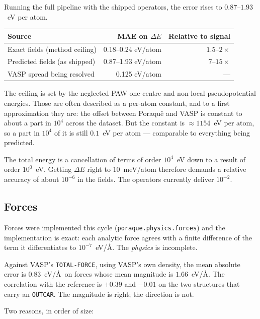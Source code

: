 \documentclass[11pt,a4paper]{report}
\newcommand{\file}[1]{\texttt{#1}}
\newcommand{\opt}[1]{\texttt{#1}}
\newcommand{\pyclass}[1]{\texttt{#1}}
\begin{document}
Running the full pipeline with the shipped operators, the error rises to
$0.87$--$1.93$~eV per atom.

\begin{center}
\begin{tabular}{@{}lrr@{}}
\toprule
Source & MAE on $\Delta E$ & Relative to signal \\
\midrule
Exact fields (method ceiling)      & 0.18--0.24 eV/atom & $1.5$--$2\times$ \\
Predicted fields (as shipped)      & 0.87--1.93 eV/atom & $7$--$15\times$ \\
VASP spread being resolved         & 0.125 eV/atom      & --- \\
\bottomrule
\end{tabular}
\end{center}

The ceiling is set by the neglected PAW one-centre and non-local
pseudopotential energies. Those are often described as a per-atom constant,
and to a first approximation they are: the offset between Poraqu\^e and VASP is
constant to about a part in $10^{4}$ across the dataset. But the constant is
$\approx 1154$~eV per atom, so a part in $10^{4}$ of it is still $0.1$~eV per
atom --- comparable to everything being predicted.

\begin{pwarn}
The total energy is a cancellation of terms of order $10^{4}$~eV down to a
result of order $10^{0}$~eV. Getting $\Delta E$ right to $10$~meV/atom
therefore demands a relative accuracy of about $10^{-6}$ in the fields. The
operators currently deliver $10^{-2}$.
\end{pwarn}

\subsection{Forces}

Forces were implemented this cycle (\pyclass{poraque.physics.forces}) and the
implementation is exact: each analytic force agrees with a finite difference of
the term it differentiates to $10^{-7}$~eV/\AA. The \emph{physics} is
incomplete.

Against VASP's \opt{TOTAL-FORCE}, using VASP's own density, the mean absolute
error is $0.83$~eV/\AA\ on forces whose mean magnitude is $1.66$~eV/\AA. The
correlation with the reference is $+0.39$ and $-0.01$ on the two structures
that carry an \file{OUTCAR}. The magnitude is right; the direction is not.

Two reasons, in order of size:
\end{document}
